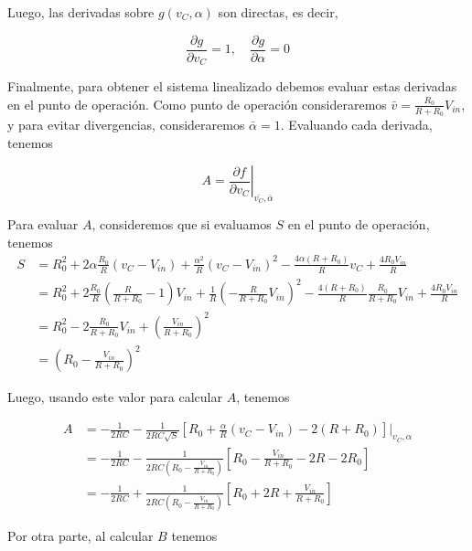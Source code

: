 \documentclass[
  11pt,
  letterpaper,
   addpoints,
   answers
  ]{exam}
\begin{document}
\begin{questions}
\begin{solution}
Luego, las derivadas sobre \(g(v_C, \alpha)\) son directas, es decir,

\begin{equation}
\frac{\partial g}{\partial v_C} = 1, \quad \frac{\partial g}{\partial \alpha} = 0
\end{equation}

Finalmente, para obtener el sistema linealizado debemos evaluar estas derivadas en el punto de operación. Como punto de operación consideraremos \(\bar{v} = \frac{R_0}{R + R_0} V_{in}\), y para evitar divergencias, consideraremos \(\bar{\alpha} = 1\). Evaluando cada derivada, tenemos

\begin{equation}
A = \left. \frac{\partial f}{\partial v_C} \right|_{\bar{v_C}, \bar{\alpha}}
\end{equation}

Para evaluar \(A\), consideremos que si evaluamos \(S\) en el punto de operación, tenemos
\begin{align}
S &= R_0^2 
   + 2\alpha \frac{R_0}{R}(v_C - V_{in})
   + \frac{\alpha^2}{R}(v_C - V_{in})^2
   - \frac{4\alpha (R+R_0)}{R} v_C
   + \frac{4R_0 V_{in}}{R} \\[6pt]
&= R_0^2 
   + 2 \frac{R_0}{R}\left(\frac{R}{R+R_0}-1\right)V_{in}
   + \frac{1}{R}\left(-\frac{R}{R+R_0}V_{in}\right)^2
   - \frac{4(R+R_0)}{R}\frac{R_0}{R+R_0}V_{in}
   + \frac{4R_0 V_{in}}{R} \\[6pt]
&= R_0^2 
   - 2 \frac{R_0}{R+R_0}V_{in}
   + \left(\frac{V_{in}}{R+R_0}\right)^2 \\[6pt]
&= \left( R_0 - \frac{V_{in}}{R+R_0} \right)^2
\end{align}


Luego, usando este valor para calcular \(A\), tenemos

\begin{align}
A &= -\frac{1}{2RC} 
     - \frac{1}{2RC\sqrt{S}}
       \left[ 
         R_0 + \frac{\alpha}{R}(v_C - V_{in}) - 2(R+R_0) 
       \right] \bigg|_{v_C,\alpha} \\
&= -\frac{1}{2RC} 
   - \frac{1}{2RC \left( R_0 - \tfrac{V_{in}}{R+R_0} \right)}
     \left[
       R_0 - \frac{V_{in}}{R+R_0} - 2R - 2R_0
     \right] \\
&= -\frac{1}{2RC} 
   + \frac{1}{2RC \left( R_0 - \tfrac{V_{in}}{R+R_0} \right)}
     \left[
       R_0 + 2R + \frac{V_{in}}{R+R_0}
     \right]
\end{align}

Por otra parte, al calcular \(B\) tenemos


\end{solution}
\end{questions}
\end{document}

